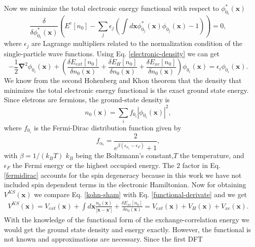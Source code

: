 Now we minimize the total electronic energy functional with respect to $\phi_{0_{i}}^{*}(\mathbf{x})$
\begin{equation}
 \frac{\delta}{\delta\phi_{0_{i}}^{*}(\mathbf{x})}\left(E^{e}[n_{0}]-\sum_{j}\epsilon_{j}(\int{d\mathbf{x}\phi_{0_{j}}^{*}(\mathbf{x})\phi_{0_{j}}(\mathbf{x})-1})\right)=0,
\end{equation}
where $\epsilon_{j}$ are Lagrange multipliers related to the normalization condition of the single-particle wave functions. Using Eq. \ref{electronic-density} we can get
\begin{equation}
\label{functional-derivate}
 -\frac{1}{2}\boldsymbol{\nabla}^{2}\phi_{0_{i}}(\mathbf{x})+\left(\frac{\delta E_{ext}[n_{0}]}{\delta n_{0}(\mathbf{x})}+\frac{\delta E_{H}[n_{0}]}{\delta n_{0}(\mathbf{x})}+\frac{
 \delta E_{xc}[n_{0}]}{\delta n_{0}(\mathbf{x})}\right)\phi_{0_{i}}(\mathbf{x})=\epsilon_{i}\phi_{0_{i}}(\mathbf{x}).
\end{equation}
We know from the second Hohenberg and Khon theorem that the density that minimizes the total electronic energy functional is the exact ground state energy. Since eletrons are fermions, the ground-state density is
\begin{equation}
 \label{ground-state-density}
 n_{0}(\mathbf{x})=\sum_{i}f_{0_{i}}|\phi_{0_{i}}(\mathbf{x})|^{2},
\end{equation}
where $f_{0_{i}}$ is the Fermi-Dirac distribution function given by
\begin{equation}
 \label{fermidirac}
 f_{\alpha_{i}}=\frac{2}{e^{\beta(\epsilon_{\alpha_{i}}-\epsilon_{F})}+1},
\end{equation}
with $\beta=1/(k_{B}T)$ $k_{B}$ being the Boltzmann's constant,$T$ the temperature, and $\epsilon_{F}$ the Fermi energy or the highest occupied energy. The $2$ factor in Eq. \ref{fermidirac} accounts for the 
spin degeneracy because in this work we have not included spin dependent terms in the electronic Hamiltonian. Now for obtaining $V^{KS}(\mathbf{x})$ we compare Eq. \ref{kohn-sham} with Eq. \ref{functional-derivate} and we get
\begin{multline}
 V^{KS}(\mathbf{x})=V_{ext}(\mathbf{x})+\int{d\mathbf{x}\frac{n_{0}(\mathbf{x})}{|\mathbf{x}-\mathbf{x}'|}}+\frac{\delta E_{xc}[n_{0}]}{\delta n_{0}(\mathbf{x})}=V_{ext}(\mathbf{x})+V_{H}(\mathbf{x})+V_{xc}(\mathbf{x}).
\end{multline}
With the knowledge of the functional form of the exchange-correlation energy we would get the ground state density and energy exactly. However, the functional is not known and approximations are necessary. Since the first DFT 
